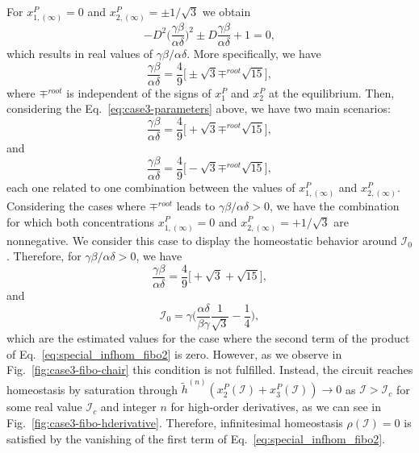 For $x_{1,(\infty)}^P = 0$ and $x_{2,(\infty)}^P = \pm 1/\sqrt{3}$ we obtain 
\begin{equation}
    -D^2\bigg(\frac{\gamma\beta}{\alpha\delta}\bigg)^2 \pm D\frac{\gamma\beta}{\alpha\delta} + 1 = 0,
\end{equation}
which results in real values of $\gamma\beta/\alpha\delta$. More specifically, we have 
\begin{equation} \label{eq:case3-parameters}
    \frac{\gamma\beta}{\alpha\delta} = \frac{4}{9}\bigg[ \pm \sqrt{3} \mp^{root} \sqrt{15} \bigg],
\end{equation}
where $\mp^{root}$ is independent of the signs of $x_1^P$ and $x_2^P$ at the equilibrium. Then,
considering the Eq.~\ref{eq:case3-parameters} above, we have two main scenarios:
\begin{equation}
    \frac{\gamma\beta}{\alpha\delta} = \frac{4}{9}\bigg[ + \sqrt{3} \mp^{root} \sqrt{15} \bigg],
\end{equation} 
and 
\begin{equation}
    \frac{\gamma\beta}{\alpha\delta} = \frac{4}{9}\bigg[ - \sqrt{3} \mp^{root} \sqrt{15} \bigg],
\end{equation}
each one related to one combination between the values of $x_{1,(\infty)}^P$ and $x_{2,(\infty)}^P$.
Considering the cases where $\mp^{root}$ leads to $\gamma\beta/\alpha\delta > 0$, we have
the combination for which both concentrations $x_{1,(\infty)}^P = 0$ and $x_{2,(\infty)}^P = +1/\sqrt{3}$ are 
nonnegative. We consider this case to display the homeostatic behavior around $\mathcal{I}_0$. Therefore, 
for $\gamma\beta/\alpha\delta > 0$, we have 
\begin{equation}
    \frac{\gamma\beta}{\alpha\delta} = \frac{4}{9}\bigg[ + \sqrt{3} + \sqrt{15} \bigg],
\end{equation}
and 
\begin{equation}
    \mathcal{I}_0 = \gamma \bigg(\frac{\alpha\delta}{\beta\gamma}\frac{1}{\sqrt{3}} - \frac{1}{4}\bigg),
\end{equation}
which are the estimated values for the case where the second term of the product 
of Eq.~\ref{eq:special_infhom_fibo2} is zero. However, as we observe in Fig.~\ref{fig:case3-fibo-chair}
this condition is not fulfilled. Instead, the circuit reaches homeostasis by saturation through
$\tilde{h}^{(n)}(x_2^P(\mathcal{I})+x_3^P(\mathcal{I})) \rightarrow 0$ as $\mathcal{I} > \mathcal{I}_c$
for some real value $\mathcal{I}_c$ and integer $n$ for high-order derivatives, as we can see 
in Fig.~\ref{fig:case3-fibo-hderivative}. Therefore, infinitesimal homeostasis $\rho(\mathcal{I}) = 0$
is satisfied by the vanishing of the first term of Eq.~\ref{eq:special_infhom_fibo2}.

